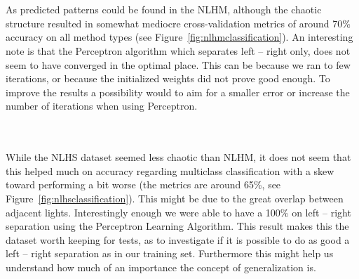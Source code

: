   \begin{minipage}{\linewidth}
  \centering
  \label{fig:nlhmclassification}
  \end{minipage}\\\\

  As predicted patterns could be found in the NLHM, although the chaotic structure resulted in somewhat mediocre cross-validation metrics of around 70\%
  accuracy on all method types (see Figure~\ref{fig:nlhmclassification}).
  An interesting note is that the Perceptron algorithm which separates left -- right only, does not seem to have converged in the optimal place.
  This can be because we ran to few iterations, or because the initialized weights did not prove good enough. To improve the results a possibility
  would to aim for a smaller error or increase the number of iterations when using Perceptron.\\

  \begin{minipage}{\linewidth}
  \centering
  \label{fig:nlhsclassification}
  \end{minipage}\\\\

  While the NLHS dataset seemed less chaotic than NLHM, it does not seem that this helped much on accuracy regarding multiclass classification with a skew
  toward performing a bit worse (the metrics are around 65\%, see Figure~\ref{fig:nlhsclassification}). 
  This might be due to the great overlap between adjacent lights. Interestingly enough we were able to have a 100\% on left -- right separation using the Perceptron Learning Algorithm.
  This result makes this the dataset worth keeping for tests, as to investigate if it is possible to do as good a left -- right separation as in our training set.
  Furthermore this might help us understand how much of an importance the concept of generalization is.\\

